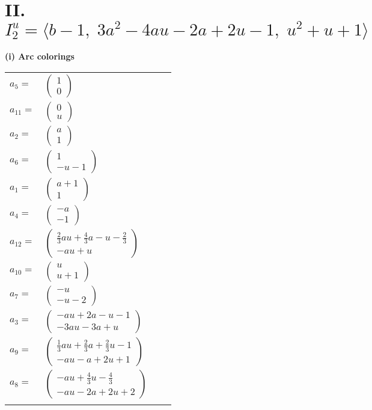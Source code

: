 \documentclass[1p]{elsarticle_modified}
\theoremstyle{definition}
\begin{document}
\centering \section*{II. $I^u_{2}= \langle b-1,\;3 a^2-4 a u-2 a+2 u-1,\;u^2+u+1 \rangle$}
\flushleft \textbf{(i) Arc colorings}\\
\begin{tabular}{m{7pt} m{180pt} m{7pt} m{180pt} }
\flushright $a_{5}=$&$\begin{pmatrix}1\\0\end{pmatrix}$ \\
\flushright $a_{11}=$&$\begin{pmatrix}0\\u\end{pmatrix}$ \\
\flushright $a_{2}=$&$\begin{pmatrix}a\\1\end{pmatrix}$ \\
\flushright $a_{6}=$&$\begin{pmatrix}1\\- u-1\end{pmatrix}$ \\
\flushright $a_{1}=$&$\begin{pmatrix}a+1\\1\end{pmatrix}$ \\
\flushright $a_{4}=$&$\begin{pmatrix}- a\\-1\end{pmatrix}$ \\
\flushright $a_{12}=$&$\begin{pmatrix}\frac{2}{3} a u+\frac{4}{3} a- u-\frac{2}{3}\\- a u+u\end{pmatrix}$ \\
\flushright $a_{10}=$&$\begin{pmatrix}u\\u+1\end{pmatrix}$ \\
\flushright $a_{7}=$&$\begin{pmatrix}- u\\- u-2\end{pmatrix}$ \\
\flushright $a_{3}=$&$\begin{pmatrix}- a u+2 a- u-1\\-3 a u-3 a+u\end{pmatrix}$ \\
\flushright $a_{9}=$&$\begin{pmatrix}\frac{1}{3} a u+\frac{2}{3} a+\frac{2}{3} u-1\\- a u- a+2 u+1\end{pmatrix}$ \\
\flushright $a_{8}=$&$\begin{pmatrix}- a u+\frac{4}{3} u-\frac{4}{3}\\- a u-2 a+2 u+2\end{pmatrix}$\\&\end{tabular}
\end{document}
